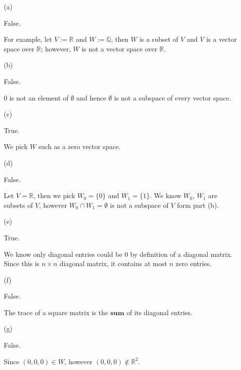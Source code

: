 \begin{Exercise}
\begin{enumerate}[(a)]
\item[(a)]
\begin{answer}
False.
\end{answer}
\begin{solution}
For example, let $V := \mathbb{R}$ and $W := \mathbb{Q}$, then $W$ is a subset of $V$ and $V$ is a vector space over $\mathbb{R}$; however, $W$ is not a vector space over $\mathbb{R}$.
\end{solution}

\item[(b)]
\begin{answer}
False.
\end{answer}
\begin{solution}
$0$ is not an element of $\emptyset$ and hence $\emptyset$ is not a subspace of every vector space.
\end{solution}

\item[(c)]
\begin{answer}
True.
\end{answer}
\begin{solution}
We pick $W$ such as a zero vector space.
\end{solution}

\item[(d)]
\begin{answer}
False.
\end{answer}
\begin{solution}
Let $V = \mathbb{R}$, then we pick $W_0 = \{0\}$ and $W_1 = \{1\}$. We know $W_0$, $W_1$ are subsets of $V$, however $W_0\cap W_1 = \emptyset$ is not a subspace of $V$ form part (b).
\end{solution}

\item[(e)]
\begin{answer}
True.
\end{answer}
\begin{solution}
We know only diagonal entries could be $0$ by definition of a diagonal matrix. Since this is $n\times n$ diagonal matrix, it contains at most $n$ zero entries.
\end{solution}

\item[(f)]
\begin{answer}
False.
\end{answer}
\begin{solution}
The trace of a square matrix is the $\mathbf{sum}$ of its diagonal entries.
\end{solution}

\item[(g)]
\begin{answer}
False.
\end{answer}
\begin{solution}
Since $(0,0,0)\in W$, however $(0,0,0)\notin \mathbb{R}^2$.
\end{solution}

\end{enumerate}
\end{Exercise}